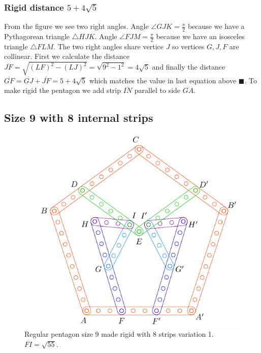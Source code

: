 \documentclass[11pt]{article}
\begin{document}
\subsubsection{Rigid distance $5 + 4\sqrt5$}

From the figure we see two right angles. Angle $\angle{GJK}=\frac{\pi}2$ because we have a Pythagorean triangle $\triangle{HJK}$. Angle $\angle{FJM}=\frac{\pi}2$ because we have an isosceles triangle $\triangle{FLM}$. The two right angles share vertice $J$ so vertices $G,J,F$ are collinear. First we calculate the distance $\overline{JF} = \sqrt{(LF)^2 - (LJ)^2} = \sqrt{9^2-1^2} = 4\sqrt5$ and finally the distance $\overline{GF} = \overline{GJ} + \overline{JF} = 5 + 4\sqrt5$ which matches the value in last equation above $\blacksquare$. To make rigid the pentagon we add strip $\overline{IN}$ parallel to side $\overline{GA}$.

\subsection{Size 9 with 8 internal strips}

\begin{figure}[H]
 \centering
 \includegraphics[scale=0.95]{9/penta9-8a}
 \caption{Regular pentagon size 9 made rigid with 8 strips variation 1. $\overline{FI} = \sqrt{55}$.}
 \label{fig:penta9-8a}
\end{figure}
\end{document}
